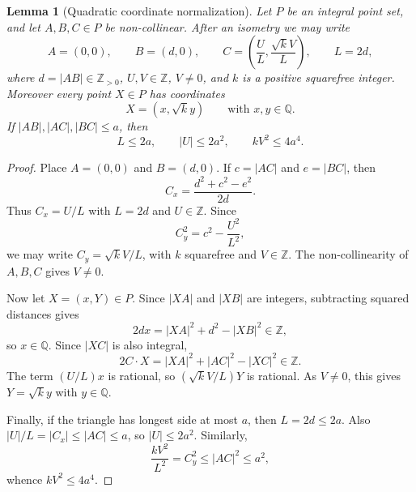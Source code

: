 \documentclass[10pt,a4paper]{amsart}
\newtheorem{lemma}[theorem]{Lemma}
\newcommand{\ZZ}{\mathbb Z}
\newcommand{\QQ}{\mathbb Q}
\begin{document}
\begin{lemma}[Quadratic coordinate normalization]\label{lem:normalization}
Let \(P\) be an integral point set, and let \(A,B,C\in P\) be non-collinear.
After an isometry we may write
\[
        A=(0,0),\qquad B=(d,0),\qquad
        C=\left(\frac{U}{L},\frac{\sqrt{k}V}{L}\right),
        \qquad L=2d,
\]
where \(d=|AB|\in\ZZ_{>0}\), \(U,V\in\ZZ\), \(V\ne0\), and \(k\) is a positive
squarefree integer.  Moreover every point \(X\in P\) has coordinates
\[
        X=(x,\sqrt{k}y)
        \qquad\text{with }x,y\in\QQ.
\]
If \(|AB|,|AC|,|BC|\le a\), then
\[
        L\le 2a,
        \qquad |U|\le 2a^2,
        \qquad kV^2\le 4a^4.
\]
\end{lemma}

\begin{proof}
Place \(A=(0,0)\) and \(B=(d,0)\).  If \(c=|AC|\) and \(e=|BC|\), then
\[
        C_x=\frac{d^2+c^2-e^2}{2d}.
\]
Thus \(C_x=U/L\) with \(L=2d\) and \(U\in\ZZ\).  Since
\[
        C_y^2=c^2-\frac{U^2}{L^2},
\]
we may write \(C_y=\sqrt{k}V/L\), with \(k\) squarefree and \(V\in\ZZ\).  The
non-collinearity of \(A,B,C\) gives \(V\ne0\).

Now let \(X=(x,Y)\in P\).  Since \(|XA|\) and \(|XB|\) are integers, subtracting
squared distances gives
\[
        2dx=|XA|^2+d^2-|XB|^2\in\ZZ,
\]
so \(x\in\QQ\).  Since \(|XC|\) is also integral,
\[
        2C\cdot X=|XA|^2+|AC|^2-|XC|^2\in\ZZ.
\]
The term \((U/L)x\) is rational, so \((\sqrt{k}V/L)Y\) is rational.  As
\(V\ne0\), this gives \(Y=\sqrt{k}y\) with \(y\in\QQ\).

Finally, if the triangle has longest side at most \(a\), then \(L=2d\le2a\).
Also \(|U|/L=|C_x|\le |AC|\le a\), so \(|U|\le2a^2\).  Similarly,
\[
        \frac{kV^2}{L^2}=C_y^2\le |AC|^2\le a^2,
\]
whence \(kV^2\le4a^4\).
\end{proof}
\end{document}

